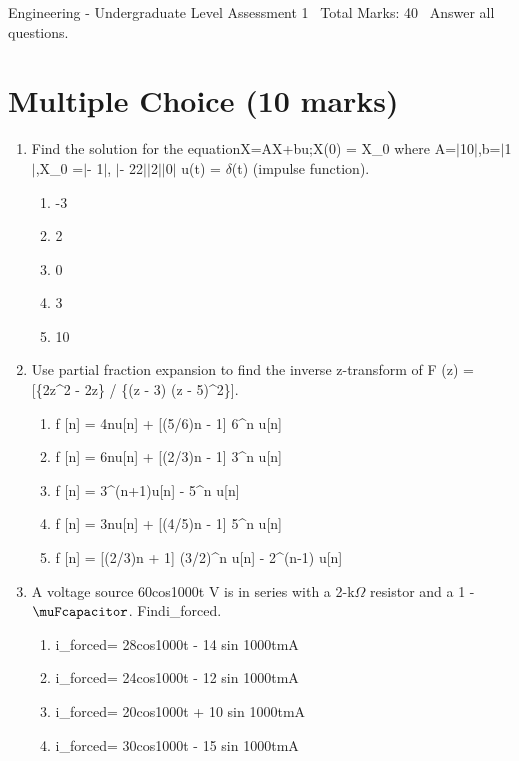 \documentclass[12pt]{article}
\begin{document}
\begin{center}
Engineering - Undergraduate Level Assessment 1 \
Total Marks: 40 \
Answer all questions.
\end{center}

\section*{Multiple Choice (10 marks)}
\begin{enumerate}[label=\arabic*.]
\item Find the solution for the equationX=AX+bu;X(0) = X\_0 where
A=\ensuremath{\vert}10\ensuremath{\vert},b=\ensuremath{\vert}1\ensuremath{\vert},X\_0 =\ensuremath{\vert}- 1\ensuremath{\vert}, \ensuremath{\vert}- 22\ensuremath{\vert}\ensuremath{\vert}2\ensuremath{\vert}\ensuremath{\vert}0\ensuremath{\vert} u(t)
= \ensuremath{\delta}(t) (impulse function).
\begin{enumerate}[label=(\alph*)]
    \item -3
    \item 2
    \item 0
    \item 3
    \item 10
\end{enumerate}
\item Use partial fraction expansion to find the inverse z-transform of F (z) = [\{2z\^{}2 - 2z\} /
\{(z - 3) (z - 5)\^{}2\}].
\begin{enumerate}[label=(\alph*)]
    \item f [n] = 4nu[n] + [(5/6)n - 1] 6\^{}n u[n]
    \item f [n] = 6nu[n] + [(2/3)n - 1] 3\^{}n u[n]
    \item f [n] = 3\^{}(n+1)u[n] - 5\^{}n u[n]
    \item f [n] = 3nu[n] + [(4/5)n - 1] 5\^{}n u[n]
    \item f [n] = [(2/3)n + 1] (3/2)\^{}n u[n] - 2\^{}(n-1) u[n]
\end{enumerate}
\item A voltage source 60cos1000t V is in series with a 2-k\ensuremath{\Omega} resistor and a 1
-\ensuremath{\muFcapacitor}. Findi\_forced.
\begin{enumerate}[label=(\alph*)]
    \item i\_forced= 28cos1000t - 14 sin 1000tmA
    \item i\_forced= 24cos1000t - 12 sin 1000tmA
    \item i\_forced= 20cos1000t + 10 sin 1000tmA
    \item i\_forced= 30cos1000t - 15 sin 1000tmA

\end{enumerate}
\end{enumerate}
\end{document}
